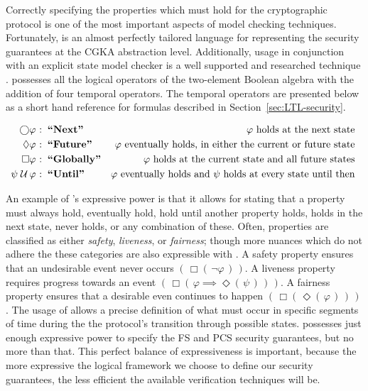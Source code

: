 Correctly specifying the properties which must hold for the cryptographic protocol is one of the most important aspects of model checking techniques.
Fortunately,  \autocite{4567924} is an almost perfectly tailored language for representing the security guarantees at the CGKA abstraction level.
Additionally,  usage in conjunction with an explicit state model checker is a well supported and researched technique \autocite{clarke1994another, biere1999symbolic, bloem1999efficient}.
 possesses all the logical operators of the two-element Boolean algebra with the addition of four temporal operators.
The temporal operators are presented below as a short hand reference for formulas described in Section\ \ref{sec:LTL-security}.

\[
\begin{aligned}[t]
                 \bigcirc & \varphi & \!\!\!\!\textrm{:} & \;\;\textbf{``Next''}     & \varphi\textrm{ holds at the next state} \hfill~ &\\
                 \Diamond & \varphi & \!\!\!\!\textrm{:} & \;\;\textbf{``Future''}   & \varphi\textrm{ eventually holds, in either the current or future state} \hfill~ &\\
                 \Box     & \varphi & \!\!\!\!\textrm{:} & \;\;\textbf{``Globally''} & \varphi\textrm{ holds at the current state and all future states} \hfill~ &\\
  \psi \;{\mathcal {U}}\, & \varphi & \!\!\!\!\textrm{:} & \;\;\textbf{``Until''}    & \varphi\textrm{ eventually holds and $\psi$ holds at every state until then} \hfill~ &\\
\end{aligned}
\]

An example of 's expressive power is that it allows for stating that a property must always hold, eventually hold, hold until another property holds, holds in the next state, never holds, or any combination of these.
Often, properties are classified as either \emph{safety}, \emph{liveness}, or \emph{fairness}; though more nuances which do not adhere the these categories are also expressible with .
A safety property ensures that an undesirable event never occurs \((\, \Box(\,\neg\varphi \,) \,)\).
A liveness property requires progress towards an event \((\, \Box(\, \varphi \implies \Diamond(\,\psi \,) \,) \,)\).
A fairness property ensures that a desirable even continues to happen \((\, \Box(\, \Diamond(\,\varphi \,) \,) \,)\).
The usage of  allows a precise definition of what must occur in specific segments of time during the the protocol's transition through possible states.
 possesses just enough expressive power to specify the FS and PCS security guarantees, but no more than that.
This perfect balance of expressiveness is important, because the more expressive the logical framework we choose to define our security guarantees, the less efficient the available verification techniques will be.
